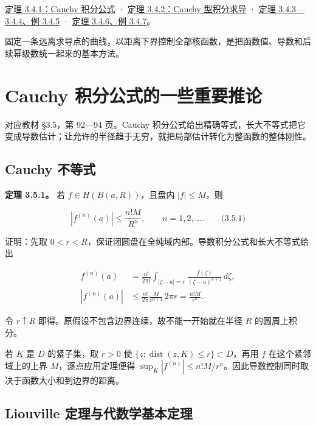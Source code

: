 \documentclass[11pt,a4paper]{article}
\begin{document}
\hyperref[ch03-s4-ux4eceux5c0fux5706ux5230ux8fb9ux754cux79efux5206]{定理
3.4.1：Cauchy 积分公式} ·
\hyperref[ch03-s4-cauchy-ux578bux79efux5206ux53caux6c42ux5bfcux7684ux5408ux6cd5ux6027]{定理
3.4.2：Cauchy 型积分求导} ·
\hyperref[ch03-s4-ux5168ux7eafux51fdux6570ux7684ux9ad8ux9636ux6b63ux5219ux6027]{定理
3.4.3---3.4.4、例 3.4.5} ·
\hyperref[ch03-s4-ux591aux8fdeux901aux79efux5206ux8868ux793aux4e0eux4f8bux9898ux6821ux52d8]{定理
3.4.6、例 3.4.7}。

固定一条远离求导点的曲线，以距离下界控制全部核函数，是把函数值、导数和后续幂级数统一起来的基本方法。

\section{Cauchy 积分公式的一些重要推论}
对应教材 §3.5，第 92---94 页。Cauchy
积分公式给出精确等式，长大不等式把它变成导数估计；让允许的半径趋于无穷，就把局部估计转化为整函数的整体刚性。

\subsection{Cauchy 不等式}\label{ch03-s5-cauchy-ux4e0dux7b49ux5f0f}

\textbf{定理 3.5.1。} 若 \(f\in H(B(a,R))\)，且盘内 \(|f|\le M\)，则

\[
|f^{(n)}(a)|\le\frac{n!M}{R^n},
\qquad n=1,2,\ldots.
\qquad\text{(3.5.1)}
\]

证明：先取
\(0<r<R\)，保证闭圆盘在全纯域内部。导数积分公式和长大不等式给出

\[
\begin{aligned}
f^{(n)}(a)&=\frac{n!}{2\pi i}\int_{|\zeta-a|=r}
\frac{f(\zeta)}{(\zeta-a)^{n+1}}\,d\zeta,\\
|f^{(n)}(a)|&\le\frac{n!}{2\pi}\frac{M}{r^{n+1}}\,2\pi r
=\frac{n!M}{r^n}.
\end{aligned}
\]

令 \(r\uparrow R\) 即得。原假设不包含边界连续，故不能一开始就在半径
\(R\) 的圆周上积分。

若 \(K\) 是 \(D\) 的紧子集，取 \(r>0\) 使
\(\{z:\operatorname{dist}(z,K)\le r\}\subset D\)，再用 \(f\)
在这个紧邻域上的上界 \(M\)，逐点应用定理便得
\(\sup_K|f^{(n)}|\le n!M/r^n\)。因此导数控制同时取决于函数大小和到边界的距离。

\subsection{Liouville
定理与代数学基本定理}\label{ch03-s5-liouville-ux5b9aux7406ux4e0eux4ee3ux6570ux5b66ux57faux672cux5b9aux7406}
\end{document}
